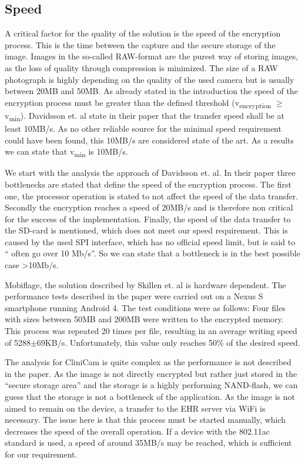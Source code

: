 \documentclass[12pt,a4paper,titlepage,oneside]{scrartcl}
\begin{document}
\subsection{Speed}
A critical factor for the quality of the solution is the speed of the encryption process.
This is the time between the capture and the secure storage of the image.
Images in the so-called RAW-format are the purest way of storing images, as the loss of quality through compression is minimized.
The size of a RAW photograph is highly depending on the quality of the used camera but is usually between 20MB and 50MB.
As already stated in the introduction the speed of the encryption process must be greater than the defined threshold (v\textsubscript{encryption} $\geq$ v\textsubscript{min}).
Davidsson et. al \cite{Davidsson2016} state in their paper that the transfer speed shall be at least 10MB/s.
As no other reliable source for the minimal speed requirement could have been found, this 10MB/s are considered state of the art.
As a results we can state that v\textsubscript{min} is 10MB/s.

We start with the analysis the approach of Davidsson et. al.
In their paper three bottlenecks are stated that define the speed of the encryption process.
The first one, the processor operation is stated to not affect the speed of the data transfer.
Secondly the encryption reaches a speed of 20MB/s and is therefore non critical for the success of the implementation.
Finally, the speed of the data transfer to the SD-card is mentioned, which does not meet our speed requirement.
This is caused by the used SPI interface, which has no official speed limit, but is said to `` often go over 10 Mb/s''\cite{leens2009introduction}.
So we can state that a bottleneck is in the best possible case >10Mb/s.

Mobiflage, the solution described by Skillen et. al \cite{skillen2013implementing} is hardware dependent.
The performance tests described in the paper were carried out on a Nexus S smartphone running Android 4.
The test conditions were as follows: 
Four files with sizes between 50MB and 200MB were written to the encrypted memory.
This process was repeated 20 times per file, resulting in an average writing speed of 5288$\pm$69KB/s.
Unfortunately, this value only reaches 50\% of the desired speed.

The analysis for CliniCam \cite{pmid25565678} is quite complex as the performance is not described in the paper.
As the image is not directly encrypted but rather just stored in the ``secure storage area'' and the storage is a highly performing NAND-flash, we can guess that the storage is not a bottleneck of the application.
As the image is not aimed to remain on the device, a transfer to the EHR server via WiFi is necessary.
The issue here is that this process must be started manually, which decreases the speed of the overall operation.
If a device with the 802.11ac standard is used, a speed of around 35MB/s may be reached, which is sufficient for our requirement.
\end{document}
